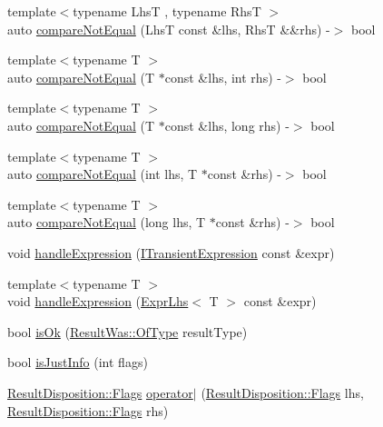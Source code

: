 \begin{DoxyCompactItemize}
\item 
{\footnotesize template$<$typename LhsT , typename RhsT $>$ }\\auto \mbox{\hyperlink{namespaceCatch_a8bec217f5ef5f09c17074c311c958f3c}{compare\+Not\+Equal}} (LhsT const \&lhs, RhsT \&\&rhs) -\/$>$ bool
\item 
{\footnotesize template$<$typename T $>$ }\\auto \mbox{\hyperlink{namespaceCatch_aa81c95898f22dce1f61d7710e495d1ee}{compare\+Not\+Equal}} (T $\ast$const \&lhs, int rhs) -\/$>$ bool
\item 
{\footnotesize template$<$typename T $>$ }\\auto \mbox{\hyperlink{namespaceCatch_adad6539b3780b9a8953221efd038e2e4}{compare\+Not\+Equal}} (T $\ast$const \&lhs, long rhs) -\/$>$ bool
\item 
{\footnotesize template$<$typename T $>$ }\\auto \mbox{\hyperlink{namespaceCatch_adb4b3e912b89a987025ca28cf0c92ba8}{compare\+Not\+Equal}} (int lhs, T $\ast$const \&rhs) -\/$>$ bool
\item 
{\footnotesize template$<$typename T $>$ }\\auto \mbox{\hyperlink{namespaceCatch_a3db634a0adf44a1148767ba149ccf34d}{compare\+Not\+Equal}} (long lhs, T $\ast$const \&rhs) -\/$>$ bool
\item 
void \mbox{\hyperlink{namespaceCatch_a65af25091f2ab61056e166765963e525}{handle\+Expression}} (\mbox{\hyperlink{structCatch_1_1ITransientExpression}{I\+Transient\+Expression}} const \&expr)
\item 
{\footnotesize template$<$typename T $>$ }\\void \mbox{\hyperlink{namespaceCatch_af2c93db76668a981e75ae835699efce7}{handle\+Expression}} (\mbox{\hyperlink{classCatch_1_1ExprLhs}{Expr\+Lhs}}$<$ T $>$ const \&expr)
\item 
bool \mbox{\hyperlink{namespaceCatch_a5205869c81c06d3460759cb86676ae68}{is\+Ok}} (\mbox{\hyperlink{structCatch_1_1ResultWas_a624e1ee3661fcf6094ceef1f654601ef}{Result\+Was\+::\+Of\+Type}} result\+Type)
\item 
bool \mbox{\hyperlink{namespaceCatch_a54b01af61673a3e1f21f31713639b180}{is\+Just\+Info}} (int flags)
\item 
\mbox{\hyperlink{structCatch_1_1ResultDisposition_a3396cad6e2259af326b3aae93e23e9d8}{Result\+Disposition\+::\+Flags}} \mbox{\hyperlink{namespaceCatch_ab32a083e442cc09f736327d2e2865999}{operator$\vert$}} (\mbox{\hyperlink{structCatch_1_1ResultDisposition_a3396cad6e2259af326b3aae93e23e9d8}{Result\+Disposition\+::\+Flags}} lhs, \mbox{\hyperlink{structCatch_1_1ResultDisposition_a3396cad6e2259af326b3aae93e23e9d8}{Result\+Disposition\+::\+Flags}} rhs)

\end{DoxyCompactItemize}
